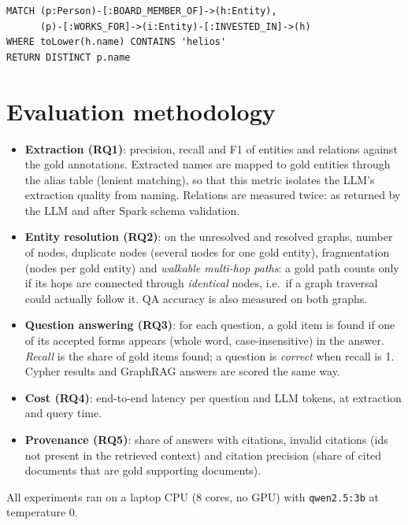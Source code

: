 \documentclass[11pt,a4paper]{report}
\newcommand{\RQ}[1]{\textbf{RQ#1}}
\begin{document}
\begin{lstlisting}[language=Cypher, caption={Reference Cypher query for the multi-hop question Q7.}]
MATCH (p:Person)-[:BOARD_MEMBER_OF]->(h:Entity),
      (p)-[:WORKS_FOR]->(i:Entity)-[:INVESTED_IN]->(h)
WHERE toLower(h.name) CONTAINS 'helios'
RETURN DISTINCT p.name
\end{lstlisting}

\chapter{Evaluation methodology}\label{ch:eval}

\begin{itemize}
  \item \textbf{Extraction (\RQ{1})}: precision, recall and F1 of entities and relations against the gold
        annotations. Extracted names are mapped to gold entities through the alias table (lenient matching), so that
        this metric isolates the LLM's extraction quality from naming. Relations are measured twice: as returned by
        the LLM and after Spark schema validation.
  \item \textbf{Entity resolution (\RQ{2})}: on the unresolved and resolved graphs, number of nodes, duplicate nodes
        (several nodes for one gold entity), fragmentation (nodes per gold entity) and \emph{walkable multi-hop
        paths}: a gold path counts only if its hops are connected through \emph{identical} nodes, i.e.\ if a graph
        traversal could actually follow it. QA accuracy is also measured on both graphs.
  \item \textbf{Question answering (\RQ{3})}: for each question, a gold item is found if one of its accepted forms
        appears (whole word, case-insensitive) in the answer. \emph{Recall} is the share of gold items found;
        a question is \emph{correct} when recall is 1. Cypher results and GraphRAG answers are scored the same way.
  \item \textbf{Cost (\RQ{4})}: end-to-end latency per question and LLM tokens, at extraction and query time.
  \item \textbf{Provenance (\RQ{5})}: share of answers with citations, invalid citations (ids not present in the
        retrieved context) and citation precision (share of cited documents that are gold supporting documents).
\end{itemize}
All experiments ran on a laptop CPU (8 cores, no GPU) with \texttt{qwen2.5:3b} at temperature 0.
\end{document}
